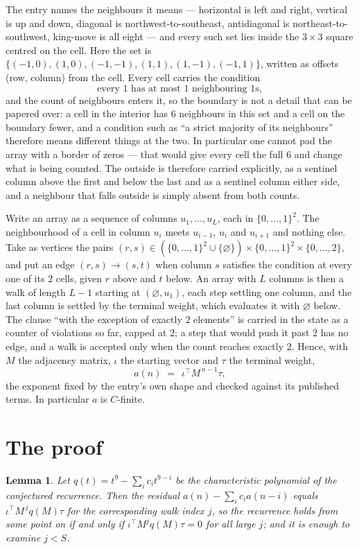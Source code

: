 \documentclass[11pt,a4paper]{article}
\theoremstyle{plain}
\newtheorem{lemma}[theorem]{Lemma}
\theoremstyle{definition}
\begin{document}
The entry names the neighbours it means --- horizontal is left and right, vertical is up and
down, diagonal is northwest-to-southeast, antidiagonal is northeast-to-southwest, king-move is
all eight --- and every such set lies inside the $3\times3$ square centred on the cell. Here
the set is $\{(-1,0), (1,0), (-1,-1), (1,1), (1,-1), (-1,1)\}$, written as offsets (row, column) from the cell. Every cell carries
the condition
\[
\text{every 1 has at most 1 neighbouring 1s},
\]
and the count of neighbours enters it, so the boundary is not a detail that can be papered
over: a cell in the interior has $6$ neighbours in this set and a cell on the boundary
fewer, and a condition such as ``a strict majority of its neighbours'' therefore means
different things at the two. In particular one cannot pad the array with a border of zeros ---
that would give every cell the full $6$ and change what is being counted. The outside is
therefore carried
explicitly, as a sentinel column above the first and below the last and as a sentinel column
either side, and a neighbour that falls outside is simply absent from both counts.

Write an array as a sequence of columns $u_1,\dots,u_L$, each in
$\{0,\dots,1\}^{2}$. The neighbourhood of a cell in column $u_i$ meets $u_{i-1}$,
$u_i$ and $u_{i+1}$ and nothing else. Take as vertices the pairs
$(r,s)\in(\{0,\dots,1\}^{2}\cup\{\varnothing\})\times\{0,\dots,1\}^{2} \times \{0,\dots,2\}$,
and put an edge $(r,s)\to(s,t)$ when column $s$ satisfies the condition at every one of its
$2$ cells, given $r$ above and $t$ below. An array with $L$ columns is then a walk of length
$L-1$ starting at $(\varnothing,u_1)$, each step settling one column, and the last column is
settled by the terminal weight, which evaluates it with $\varnothing$ below. The clause ``with the exception of exactly $2$ elements'' is carried in
the state as a counter of violations so far, capped at $2$; a step that would push it past
$2$ has no edge, and a walk is accepted only when the count reaches exactly $2$. Hence,
with $M$ the adjacency matrix, $\iota$ the starting vector and $\tau$ the terminal weight,
\[
a(n)\;=\;\,\iota^{\!\top}M^{\,n-1}\tau ,
\]
the exponent fixed by the entry's own shape and checked against its published terms. In
particular $a$ is $C$-finite.

\section{The proof}

\begin{lemma}\label{lem:crit}
Let $q(t)=t^{9}-\sum_i c_it^{9-i}$ be the characteristic polynomial of the
conjectured recurrence. Then the residual $a(n)-\sum_ic_ia(n-i)$ equals
$\iota^{\!\top}M^{\,j}q(M)\tau$ for the corresponding walk index $j$, so the
recurrence holds from some point on if and only if $\iota^{\!\top}M^{j}q(M)\tau=0$ for all
large $j$; and it is enough to examine $j<S$.
\end{lemma}
\end{document}
